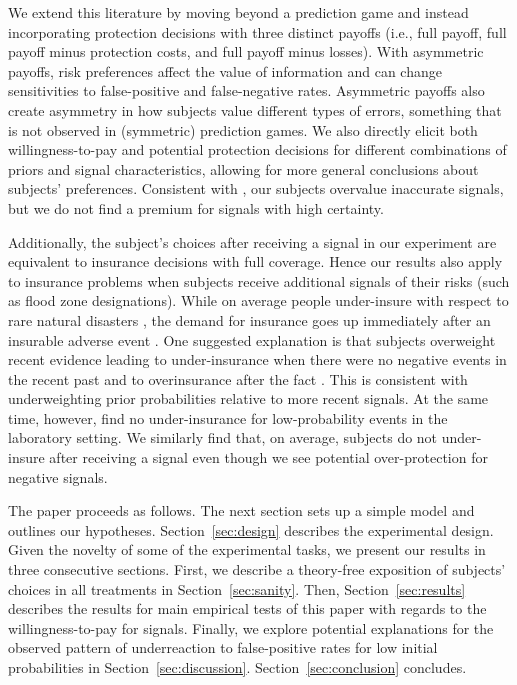 \documentclass[12pt,a4paper]{article}
\begin{document}
We extend this literature by moving beyond a prediction game and instead incorporating protection decisions with three distinct payoffs (i.e., full payoff, full payoff minus protection costs, and full payoff minus losses). With asymmetric payoffs, risk preferences affect the value of information and can change sensitivities to false-positive and false-negative rates. Asymmetric payoffs also create asymmetry in how subjects value different types of errors, something that is not observed in (symmetric) prediction games. We also directly elicit both willingness-to-pay and potential protection decisions for different combinations of priors and signal characteristics, allowing for more general conclusions about subjects' preferences. Consistent with \citet{ambuehl_belief_2018}, our subjects overvalue inaccurate signals, but we do not find a premium for signals with high certainty.  

Additionally, the subject's choices after receiving a signal in our experiment are equivalent to insurance decisions with full coverage. Hence our results also apply to insurance problems when subjects receive additional signals of their risks (such as flood zone designations). While on average people under-insure with respect to rare natural disasters \citep{friedl_insurance_2014}, the demand for insurance goes up immediately after an insurable adverse event \citep[e.g.,][]{kousky_understanding_2011}. One suggested explanation is that subjects overweight recent evidence leading to under-insurance when there were no negative events in the recent past and to overinsurance after the fact \citep{volkman-wise_representativeness_2015}. This is consistent with underweighting prior probabilities relative to more recent signals. At the same time, however, \citet{laury_insurance_2009} find no under-insurance for low-probability events in the laboratory setting.  We similarly find that, on average, subjects do not under-insure after receiving a signal even though we see potential over-protection for negative signals.

The paper proceeds as follows. The next section sets up a simple model and outlines our hypotheses. Section~\ref{sec:design} describes the experimental design. Given the novelty of some of the experimental tasks, we present our results in three consecutive sections. First, we describe a theory-free exposition of subjects' choices in all treatments in Section~\ref{sec:sanity}. Then, Section~\ref{sec:results} describes the results for main empirical tests of this paper with regards to the willingness-to-pay for signals. Finally, we explore potential explanations for the observed pattern of underreaction to false-positive rates for low initial probabilities in Section~\ref{sec:discussion}. Section~\ref{sec:conclusion} concludes. 
\end{document}
